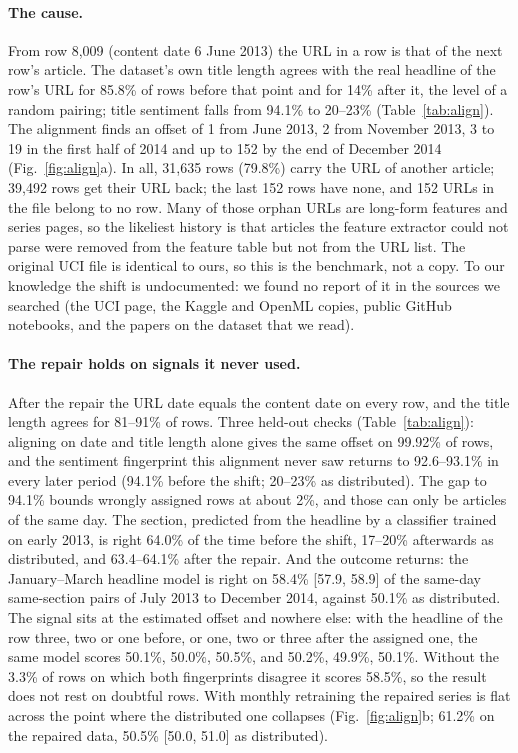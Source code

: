 \documentclass[10pt,a4paper,twocolumn]{article}
\begin{document}
\paragraph{The cause.} From row 8{,}009 (content date 6 June 2013) the URL in a row is that of the next row's
article. The dataset's own title length agrees with the real headline of the row's URL for 85.8\% of rows before
that point and for 14\% after it, the level of a random pairing; title sentiment falls from 94.1\% to 20--23\%
(Table~\ref{tab:align}). The alignment finds an offset of 1 from June 2013, 2 from November 2013, 3 to 19 in the
first half of 2014 and up to 152 by the end of December 2014 (Fig.~\ref{fig:align}a). In all, 31{,}635 rows
(79.8\%) carry the URL of another article; 39{,}492 rows get their URL back; the last 152 rows have none, and 152
URLs in the file belong to no row. Many of those orphan URLs are long-form features and series pages, so the
likeliest history is that articles the feature extractor could not parse were removed from the feature table but
not from the URL list. The original UCI file is identical to ours, so this is the benchmark, not a copy. To our
knowledge the shift is undocumented: we found no report of it in the sources we searched (the UCI page, the
Kaggle and OpenML copies, public GitHub notebooks, and the papers on the dataset that we read).

\paragraph{The repair holds on signals it never used.} After the repair the URL date equals the content date on
every row, and the title length agrees for 81--91\% of rows. Three held-out checks (Table~\ref{tab:align}):
aligning on date and title length alone gives the same offset on 99.92\% of rows, and the sentiment fingerprint
this alignment never saw returns to 92.6--93.1\% in every later period (94.1\% before the shift; 20--23\% as
distributed). The gap to 94.1\% bounds wrongly assigned rows at about 2\%, and those can only be articles of the
same day. The section, predicted from the headline by a classifier trained on early 2013, is right 64.0\% of the
time before the shift, 17--20\% afterwards as distributed, and 63.4--64.1\% after the repair. And the outcome
returns: the January--March headline model is right on 58.4\% [57.9, 58.9] of the same-day same-section pairs
of July 2013 to December 2014, against 50.1\% as distributed. The signal sits at the estimated offset and
nowhere else: with the headline of the row three, two or one before, or one, two or three after the assigned one,
the same model scores 50.1\%, 50.0\%, 50.5\%, and 50.2\%, 49.9\%, 50.1\%. Without the 3.3\% of rows on
which both fingerprints disagree it scores 58.5\%, so the result does not rest on doubtful rows. With monthly
retraining the repaired series is flat across the point where the distributed one collapses
(Fig.~\ref{fig:align}b; 61.2\% on the repaired data, 50.5\% [50.0, 51.0] as distributed).
\end{document}

